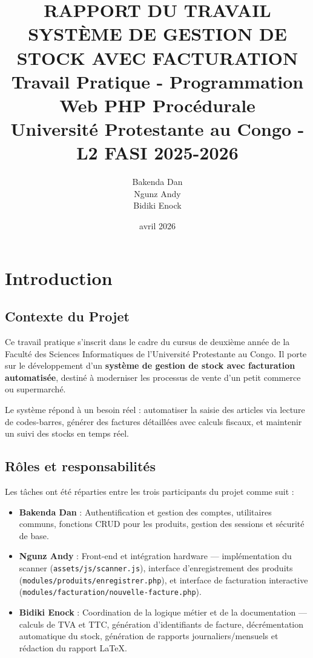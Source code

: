 \documentclass[12pt,a4paper]{report}
\title{
    \textbf{RAPPORT DU TRAVAIL} \\
    \Large SYSTÈME DE GESTION DE STOCK AVEC FACTURATION \\
    \vspace{0.5cm}
    \normalsize Travail Pratique - Programmation Web PHP Procédurale \\
    \vspace{0.2cm}
    \small Université Protestante au Congo - L2 FASI 2025-2026
}
\author{Bakenda Dan \\
Ngunz Andy \\
Bidiki Enock}
\date{avril 2026}
\begin{document}
\maketitle
\pagebreak

\tableofcontents
\pagebreak

\chapter{Introduction}

\section{Contexte du Projet}

Ce travail pratique s'inscrit dans le cadre du cursus de deuxième année de la Faculté des Sciences Informatiques de l'Université Protestante au Congo. Il porte sur le développement d'un \textbf{système de gestion de stock avec facturation automatisée}, destiné à moderniser les processus de vente d'un petit commerce ou supermarché.

Le système répond à un besoin réel : automatiser la saisie des articles via lecture de codes-barres, générer des factures détaillées avec calculs fiscaux, et maintenir un suivi des stocks en temps réel.

\section{Rôles et responsabilités}

Les tâches ont été réparties entre les trois participants du projet comme suit :

\begin{itemize}
    \item \textbf{Bakenda Dan} : Authentification et gestion des comptes, utilitaires communs, fonctions CRUD pour les produits, gestion des sessions et sécurité de base.
    \item \textbf{Ngunz Andy} : Front-end et intégration hardware — implémentation du scanner (\texttt{assets/js/scanner.js}), interface d'enregistrement des produits (\texttt{modules/produits/enregistrer.php}), et interface de facturation interactive (\texttt{modules/facturation/nouvelle-facture.php}).
    \item \textbf{Bidiki Enock} : Coordination de la logique métier et de la documentation — calculs de TVA et TTC, génération d'identifiants de facture, décrémentation automatique du stock, génération de rapports journaliers/mensuels et rédaction du rapport LaTeX.
\end{itemize}
\end{document}
